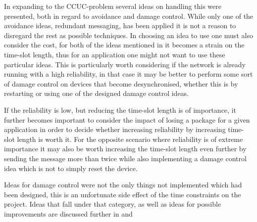 \bigskip \noindent
In expanding to the CCUC-problem several ideas on handling this were presented, both in regard to avoidance and damage control.
While only one of the avoidance ideas, redundant messaging, has been applied it is not a reason to disregard the rest as possible techniques.
In choosing an idea to use one must also consider the cost, for both of the ideas mentioned in  it becomes a strain on the time-slot length, thus for an application one might not want to use these particular ideas.
This is particularly worth considering if the network is already running with a high reliability, in that case it may be better to perform some sort of damage control on devices that become desynchronised, whether this is by restarting or using one of the designed damage control ideas. 

If the reliability is low, but reducing the time-slot length is of importance, it further becomes important to consider the impact of losing a package for a given application in order to decide whether increasing reliability by increasing time-slot length is worth it.
For the opposite scenario where reliability is of extreme importance it may also be worth increasing the time-slot length even further by sending the message more than twice while also implementing a damage control idea which is not to simply reset the device.

\bigskip \noindent
Ideas for damage control were not the only things not implemented which had been designed, this is an unfortunate side effect of the time constraints on the project.
Ideas that fall under that category, as well as ideas for possible improvements are discussed further in  and 